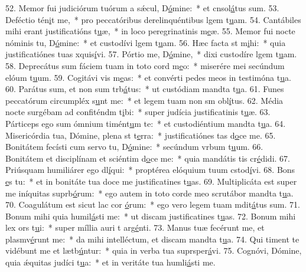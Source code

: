 52. Memor fui judiciórum tuórum a sǽcul, D\uline{ó}mine:~* et cnsol\uline{á}tus sum.
53. Deféctio tén\uline{i}t me,~* pro peccatóribus derelinquéntibus lgem t\uline{u}am.
54. Cantábiles mihi erant justificatións t\uline{u}æ,~* in loco peregrinatinis m\uline{e}æ.
55. Memor fui nocte nóminis tu, D\uline{ó}mine:~* et custodívi lgem t\uline{u}am.
56. Hæc facta st m\uline{i}hi:~* quia justificatiónes tuas xquis\uline{í}vi.
57. Pórtio me, D\uline{ó}mine,~* dixi custodíre lgem t\uline{u}am.
58. Deprecátus sum fáciem tuam in toto cord m\uline{e}o:~* miserére mei secúndum elóum t\uline{u}um.
59. Cogitávi vis m\uline{e}as:~* et convérti pedes meos in testimóna t\uline{u}a.
60. Parátus sum, et non sum trb\uline{á}tus:~* ut custódiam mandta t\uline{u}a.
61. Funes peccatórum circumpléx s\uline{u}nt me:~* et legem tuam non sm obl\uline{í}tus.
62. Média nocte surgébam ad confiténdm t\uline{i}bi:~* super judícia justificatinis t\uline{u}æ.
63. Párticeps ego sum ómnium timént\uline{u}m te:~* et custodiéntium mandta t\uline{u}a.
64. Misericórdia tua, Dómine, plena st t\uline{e}rra:~* justificatiónes tas d\uline{o}ce me.
65. Bonitátem fecísti cum servo tu, D\uline{ó}mine:~* secúndum vrbum t\uline{u}um.
66. Bonitátem et disciplínam et sciéntim d\uline{o}ce me:~* quia mandátis tis cr\uline{é}didi.
67. Priúsquam humiliárer ego dl\uline{í}qui:~* proptérea elóquium tuum cstod\uline{í}vi.
68. Bons \uline{e}s tu:~* et in bonitáte tua doce me justificatines t\uline{u}as.
69. Multiplicáta est super me iníquitas suprb\uline{ó}rum:~* ego autem in toto corde meo scrutábor mandta t\uline{u}a.
70. Coagulátum est sicut lac cor \uline{ó}rum:~* ego vero legem tuam mdit\uline{á}tus sum.
71. Bonum mihi quia humil\uline{á}sti me:~* ut discam justificatines t\uline{u}as.
72. Bonum mihi lex ors t\uline{u}i:~* super míllia auri t arg\uline{é}nti.
73. Manus tuæ fecérunt me, et plasmv\uline{é}runt me:~* da mihi intelléctum, et discam mandta t\uline{u}a.
74. Qui timent te vidébunt me et lætb\uline{ú}ntur:~* quia in verba tua suprsper\uline{á}vi.
75. Cognóvi, Dómine, quia ǽquitas judíci t\uline{u}a:~* et in veritáte tua humli\uline{á}sti me.
